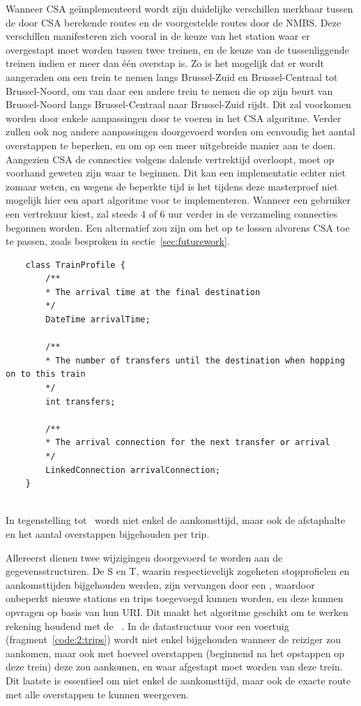Wanneer CSA geïmplementeerd wordt zijn duidelijke verschillen merkbaar tussen de door CSA berekende routes en de voorgestelde routes door de NMBS. Deze verschillen manifesteren zich vooral in de keuze van het station waar er overgestapt moet worden tussen twee treinen, en de keuze van de tussenliggende treinen indien er meer dan één overstap is. Zo is het mogelijk dat er wordt aangeraden om een trein te nemen langs Brussel-Zuid en Brussel-Centraal tot Brussel-Noord, om van daar een andere trein te nemen die op zijn beurt van Brussel-Noord langs Brussel-Centraal naar Brussel-Zuid rijdt. Dit zal voorkomen worden door enkele aanpassingen door te voeren in het CSA algoritme.
Verder zullen ook nog andere aanpassingen doorgevoerd worden om eenvoudig het aantal overstappen te beperken, en om op een meer uitgebreide manier aan  te doen. Aangezien CSA de connecties volgens dalende vertrektijd overloopt, moet op voorhand geweten zijn waar te beginnen. Dit kan een implementatie echter niet zomaar weten, en wegens de beperkte tijd is het tijdens deze masterproef niet mogelijk hier een apart algoritme voor te implementeren. Wanneer een gebruiker een vertrekuur kiest, zal steeds 4 of 6 uur verder in de verzameling connecties begonnen worden. Een alternatief zou zijn om het  op te lossen alvorens CSA toe te passen, zoals besproken in sectie~\ref{sec:futurework}.

\begin{listing}[htb]
	\begin{verbatim}
	class TrainProfile {
		/**
		* The arrival time at the final destination
		*/
		DateTime arrivalTime;
		
		/**
		* The number of transfers until the destination when hopping on to this train
		*/
		int transfers;
		
		/**
		* The arrival connection for the next transfer or arrival
		*/
		LinkedConnection arrivalConnection;
	}
	
	\end{verbatim}
	\caption[CSA: Gegevensstructuur voor trips]{In tegenstelling tot~\cite{strasser17} wordt niet enkel de aankomsttijd, maar ook de afstaphalte en het aantal overstappen bijgehouden per trip.}
	\label{code:2:trips}
\end{listing}

Allereerst dienen twee wijzigingen doorgevoerd te worden aan de gegevensstructuren. De  S en T, waarin respectievelijk zogeheten stopprofielen en aankomsttijden bijgehouden werden, zijn vervangen door een , waardoor onbeperkt nieuwe stations en trips toegevoegd kunnen worden, en deze kunnen opvragen op basis van hun URI. Dit maakt het algoritme geschikt om te werken rekening houdend met de ~\cite{colpaert17}.
In de datastructuur voor een voertuig (fragment~\ref{code:2:trips}) wordt niet enkel bijgehouden wanneer de reiziger zou aankomen, maar ook met hoeveel overstappen (beginnend na het opstappen op deze trein) deze zou aankomen, en waar afgestapt moet worden van deze trein. Dit laatste is essentieel om niet enkel de aankomsttijd, maar ook de exacte route met alle overstappen te kunnen weergeven. 

